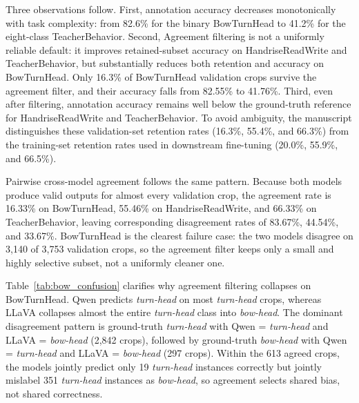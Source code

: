 \documentclass{ieeeaccess}
\begin{document}
Three observations follow.
First, annotation accuracy decreases monotonically with task
complexity: from 82.6\% for the binary BowTurnHead to 41.2\% for the
eight-class TeacherBehavior.
Second, Agreement filtering is not a uniformly reliable default: it improves
retained-subset accuracy on HandriseReadWrite and TeacherBehavior, but
substantially reduces both retention and accuracy on BowTurnHead.
Only 16.3\% of BowTurnHead validation crops survive the agreement
filter, and their accuracy falls from 82.55\% to 41.76\%.
Third, even after filtering, annotation accuracy remains well below the
ground-truth reference for HandriseReadWrite and TeacherBehavior.
To avoid ambiguity, the manuscript distinguishes these validation-set
retention rates (16.3\%, 55.4\%, and 66.3\%) from the training-set
retention rates used in downstream fine-tuning (20.0\%, 55.9\%, and
66.5\%).

Pairwise cross-model agreement follows the same pattern. Because both
models produce valid outputs for almost every validation crop, the
agreement rate is 16.33\% on BowTurnHead, 55.46\% on
HandriseReadWrite, and 66.33\% on TeacherBehavior, leaving
corresponding disagreement rates of 83.67\%, 44.54\%, and 33.67\%.
BowTurnHead is the clearest failure case: the two models disagree on
3{,}140 of 3{,}753 validation crops, so the agreement filter keeps only
a small and highly selective subset, not a uniformly cleaner one.

\begin{table}[!t]
\caption{BowTurnHead validation-set confusion counts for Qwen and
LLaVA. Rows denote ground-truth labels; columns denote model
predictions.}
\label{tab:bow_confusion}
\centering
{}
\end{table}

Table~\ref{tab:bow_confusion} clarifies why agreement filtering
collapses on BowTurnHead. Qwen predicts \textit{turn-head} on most
\textit{turn-head} crops, whereas LLaVA collapses almost the entire
\textit{turn-head} class into \textit{bow-head}. The dominant
disagreement pattern is ground-truth \textit{turn-head} with
Qwen = \textit{turn-head} and LLaVA = \textit{bow-head}
(2{,}842 crops), followed by ground-truth \textit{bow-head} with
Qwen = \textit{turn-head} and LLaVA = \textit{bow-head}
(297 crops). Within the 613 agreed crops, the models jointly predict
only 19 \textit{turn-head} instances correctly but jointly mislabel
351 \textit{turn-head} instances as \textit{bow-head}, so agreement
selects shared bias, not shared correctness.
\end{document}
